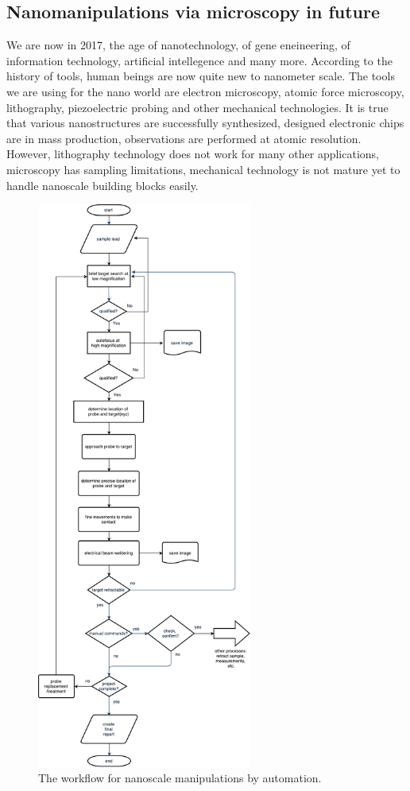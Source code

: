 \subsection{Nanomanipulations via microscopy in future}
We are now in 2017, the age of nanotechnology, of gene eneineering, of information technology, artificial intellegence and many more. According to the history of tools, human beings are now quite new to nanometer scale. The tools we are using for the nano world are electron microscopy, atomic force microscopy, lithography, piezoelectric probing and other mechanical technologies. It is true that various nanostructures are successfully synthesized, designed electronic chips are in mass production, observations are performed at atomic resolution. However, lithography technology does not work for many other applications, microscopy has sampling limitations, mechanical technology is not mature yet to handle nanoscale building blocks easily. 

\begin{figure}  
\centering
\includegraphics[width=200pt]{figures/aifornanomanipulation}
\caption[AI for Nanomanipulation]
{The workflow for nanoscale manipulations by automation.
\label{fig:7_aiworkflow}}
\end{figure}

